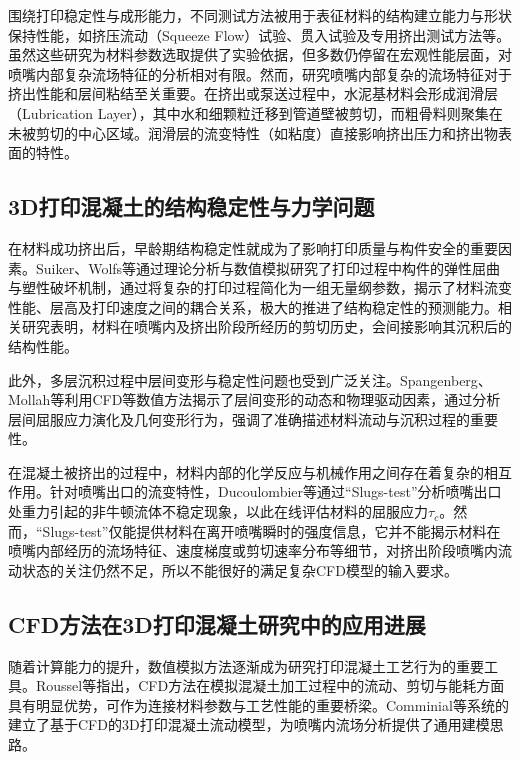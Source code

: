 围绕打印稳定性与成形能力，不同测试方法被用于表征材料的结构建立能力与形状保持性能，如挤压流动（Squeeze Flow）试验、贯入试验及专用挤出测试方法等\cite{tao2022,meeten2002,engmann2005,pott2021,ducoulombier2021,yuan2019}。虽然这些研究为材料参数选取提供了实验依据，但多数仍停留在宏观性能层面，对喷嘴内部复杂流场特征的分析相对有限。然而，研究喷嘴内部复杂的流场特征对于挤出性能和层间粘结至关重要。在挤出或泵送过程中，水泥基材料会形成润滑层（Lubrication Layer），其中水和细颗粒迁移到管道壁被剪切，而粗骨料则聚集在未被剪切的中心区域。润滑层的流变特性（如粘度）直接影响挤出压力和挤出物表面的特性\cite{chen2020}。

\subsection{3D打印混凝土的结构稳定性与力学问题}

在材料成功挤出后，早龄期结构稳定性就成为了影响打印质量与构件安全的重要因素。Suiker、Wolfs等通过理论分析与数值模拟研究了打印过程中构件的弹性屈曲与塑性破坏机制，通过将复杂的打印过程简化为一组无量纲参数，揭示了材料流变性能、层高及打印速度之间的耦合关系，极大的推进了结构稳定性的预测能力\cite{suiker2020,suiker2022,suiker2018,wolfs2018}。相关研究表明，材料在喷嘴内及挤出阶段所经历的剪切历史，会间接影响其沉积后的结构性能。

此外，多层沉积过程中层间变形与稳定性问题也受到广泛关注。Spangenberg、Mollah等利用CFD等数值方法揭示了层间变形的动态和物理驱动因素，通过分析层间屈服应力演化及几何变形行为，强调了准确描述材料流动与沉积过程的重要性\cite{spangenberg2021,mollah2021,mollah2023}。

在混凝土被挤出的过程中，材料内部的化学反应与机械作用之间存在着复杂的相互作用。针对喷嘴出口的流变特性，Ducoulombier等\cite{ducoulombier2021}通过``Slugs-test''分析喷嘴出口处重力引起的非牛顿流体不稳定现象，以此在线评估材料的屈服应力$\tau_c$。然而，``Slugs-test''仅能提供材料在离开喷嘴瞬时的强度信息，它并不能揭示材料在喷嘴内部经历的流场特征、速度梯度或剪切速率分布等细节，对挤出阶段喷嘴内流动状态的关注仍然不足，所以不能很好的满足复杂CFD模型的输入要求。

\subsection{CFD方法在3D打印混凝土研究中的应用进展}

随着计算能力的提升，数值模拟方法逐渐成为研究打印混凝土工艺行为的重要工具。Roussel等\cite{roussel2020}指出，CFD方法在模拟混凝土加工过程中的流动、剪切与能耗方面具有明显优势，可作为连接材料参数与工艺性能的重要桥梁。Comminial等\cite{comminial2020}系统的建立了基于CFD的3D打印混凝土流动模型，为喷嘴内流场分析提供了通用建模思路。

